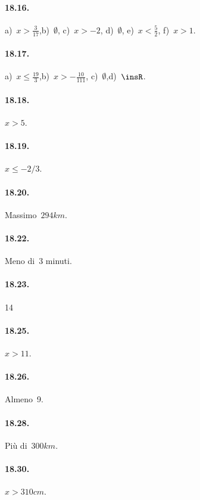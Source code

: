 \paragraph{18.16.} a)~$x>\frac{3}{17}$,\quad b)~$\emptyset$,\quad
c)~$x>-2$, \quad d)~$\emptyset$, \quad e)~$x<\frac{5}{2}$, \quad f)~$x>1$.

\paragraph{18.17.} a)~$x\le \frac{19}{3}$,\quad b)~$x>-{\frac{10}{111}}$,\quad
c)~$\emptyset $,\quad d)~$\insR$.

\begin{multicols}{2}
\paragraph{18.18.} $x>5$.

\paragraph{18.19.} $x\le -2/3$.

\paragraph{18.20.} Massimo~$294\unit{km}$.

\paragraph{18.22.} Meno di~3 minuti.

\paragraph{18.23.} 14

\paragraph{18.25.} $x>11$.

\paragraph{18.26.} Almeno~9.

\paragraph{18.28.} Più di~$300\unit{km}$.

\paragraph{18.30.} $x>310\unit{cm}$.


\end{multicols}
